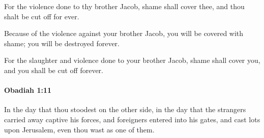 			\begin{versebox}
					\item[BHS] 
					\item[LXX] 
					\item[ASV] For the violence done to thy brother Jacob, shame shall cover thee, and thou shalt be cut off for ever.
					\item[NIV] Because of the violence against your brother Jacob, you will be covered with shame; you will be destroyed forever.
					\item[NRSV] For the slaughter and violence done to your brother Jacob, shame shall cover you, and you shall be cut off forever.
			\end{versebox}

		\paragraph{Obadiah 1:11} %
			\label{OBADIAH-1-11}

			In the day that thou stoodest on the other side, in the day that the strangers carried away captive his forces, and foreigners entered into his gates, and cast lots upon Jerusalem, even thou wast as one of them.

